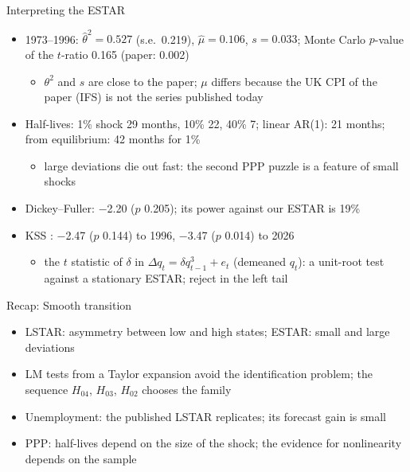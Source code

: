 \begin{frame}{Interpreting the ESTAR}
\itemsize{\footnotesize}
\begin{itemize}
    \item 1973--1996: $\hat\theta^2 = 0.527$ (s.e.\ 0.219), $\hat\mu = 0.106$, $s = 0.033$; Monte Carlo $p$-value of the $t$-ratio 0.165 (paper: 0.002)
    \begin{itemize}
        \item $\theta^2$ and $s$ are close to the paper; $\mu$ differs because the UK CPI of the paper (IFS) is not the series published today
    \end{itemize}
    \item Half-lives: 1\% shock 29 months, 10\% 22, 40\% 7; linear AR(1): 21 months; from equilibrium: 42 months for 1\%
    \begin{itemize}
        \item large deviations die out fast: the second PPP puzzle is a feature of small shocks
    \end{itemize}
    \item Dickey--Fuller: \ensuremath{-}2.20 ($p$ 0.205); its power against our ESTAR is 19\%
    \item KSS : \ensuremath{-}2.47 ($p$ 0.144) to 1996, \ensuremath{-}3.47 ($p$ 0.014) to 2026
    \begin{itemize}
        \item the $t$ statistic of $\delta$ in $\Delta q_t = \delta q_{t-1}^3 + e_t$ (demeaned $q_t$): a unit-root test against a stationary ESTAR; reject in the left tail
    \end{itemize}
\end{itemize}
\end{frame}

\begin{frame}{Recap: Smooth transition}
\itemsize{\small}
\begin{itemize}
    \item LSTAR: asymmetry between low and high states; ESTAR: small and large deviations
    \item LM tests from a Taylor expansion avoid the identification problem; the sequence $H_{04}$, $H_{03}$, $H_{02}$ chooses the family
    \item Unemployment: the published LSTAR replicates; its forecast gain is small
    \item PPP: half-lives depend on the size of the shock; the evidence for nonlinearity depends on the sample
\end{itemize}
\end{frame}


